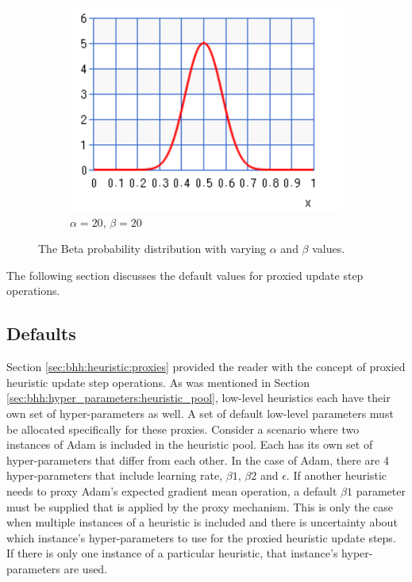 \begin{figure}[htbp]
      \par\bigskip
      \begin{subfigure}{0.49\textwidth}
            \centering
            \centering
            \includegraphics[width=\textwidth]{images/beta_20_20.pdf}
            \caption{$\alpha=20$, $\beta=20$}
            \label{sec:bhh:hyper_parameters:normalisation_beta_20_20}
      \end{subfigure}
      \par\bigskip
      \caption{The Beta probability distribution with varying $\alpha$ and $\beta$ values.}
      \label{sec:bhh:hyper_parameters:discounted_rewards:normalisation}
\end{figure}

The following section discusses the default values for proxied update step operations.

\subsection{Defaults}
\label{sec:bhh:hyper_parameters:defaults}

Section \ref{sec:bhh:heuristic:proxies} provided the reader with the concept of proxied heuristic update step operations. As was mentioned in Section \ref{sec:bhh:hyper_parameters:heuristic_pool}, low-level heuristics each have their own set of hyper-parameters as well. A set of default low-level parameters must be allocated specifically for these proxies. Consider a scenario where two instances of \acs{Adam} is included in the heuristic pool. Each has its own set of hyper-parameters that differ from each other. In the case of \acs{Adam}, there are 4 hyper-parameters that include learning rate, $\beta1$, $\beta2$ and $\epsilon$. If another heuristic needs to proxy \acs{Adam}'s expected gradient mean operation, a default $\beta1$ parameter must be supplied that is applied by the proxy mechanism. This is only the case when multiple instances of a heuristic is included and there is uncertainty about which instance's hyper-parameters to use for the proxied heuristic update steps. If there is only one instance of a particular heuristic, that instance's hyper-parameters are used.

